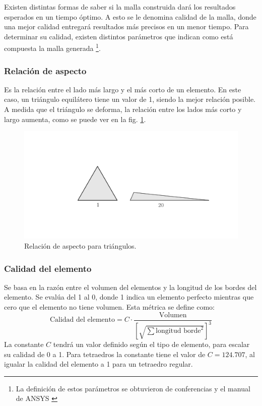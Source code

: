Existen distintas formas de saber si la malla construida dará los resultados esperados en un tiempo óptimo. A esto se le denomina calidad de la malla, donde una mejor calidad entregará resultados más precisos en un menor tiempo. Para determinar su calidad, existen distintos parámetros que indican como está compuesta la malla generada \footnote{La definición de estos parámetros se obtuvieron de conferencias y el manual de ANSYS \cite{sharcnet_2017}\cite{ansys_2015}}.

\subsubsection{Relación de aspecto}
Es la relación entre el lado más largo y el más corto de un elemento. En este caso, un triángulo equilátero tiene un valor de 1, siendo la mejor relación posible. A medida que el triángulo se deforma, la relación entre los lados más corto y largo aumenta, como se puede ver en la fig. \ref{fig:asp_ratio}.

\begin{figure}[h]
\centering
\includegraphics[width=0.5\linewidth, trim={12cm 7cm 6.5cm 7.5cm}, clip]{Imagenes/asp_ratio.pdf}
\caption{Relación de aspecto para triángulos.}
\label{fig:asp_ratio}
\end{figure}

\subsubsection{Calidad del elemento}
Se basa en la razón entre el volumen del elementos y la longitud de los bordes del elemento. Se evalúa del 1 al 0, donde 1 indica un elemento perfecto mientras que cero que el elemento no tiene volumen. Esta métrica se define como:
\begin{equation}
	\text{Calidad del elemento} = C \cdot \frac{\text{Volumen}}{\left[\sqrt{\sum \text{longitud borde}^2}\right]^3}
\end{equation}
La constante $C$ tendrá un valor definido según el tipo de elemento, para escalar su calidad de 0 a 1. Para tetraedros la constante tiene el valor de $C=124.707$, al igualar la calidad del elemento a 1 para un tetraedro regular.

